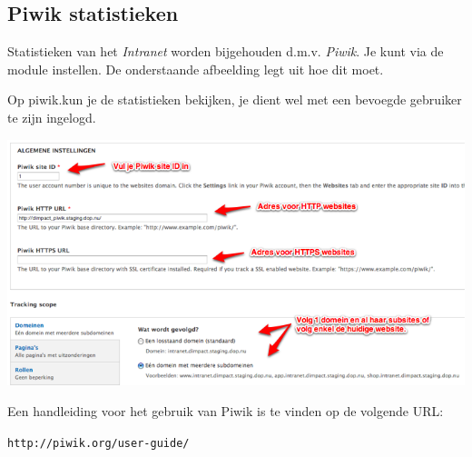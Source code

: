 \subsection{Piwik statistieken}\label{piwikstatistieken}
Statistieken van het \emph{Intranet} worden bijgehouden d.m.v. \emph{Piwik}. 
Je kunt via  de module instellen. De onderstaande afbeelding legt uit hoe dit moet. 

Op piwik.\drupalpath kun je de statistieken bekijken, je dient wel met een bevoegde gebruiker te zijn ingelogd. 

\begin{center}
	\includegraphics[width=\textwidth]{img/piwik.png}
\end{center}

Een handleiding voor het gebruik van Piwik is te vinden op de volgende URL:

\texttt{http://piwik.org/user-guide/}